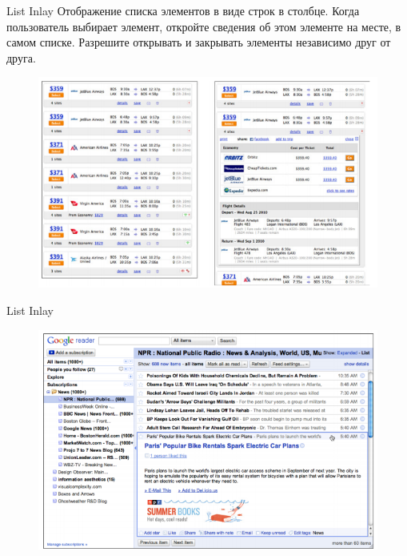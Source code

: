 \documentclass{beamer}
\begin{document}
\begin{frame}[t]{List Inlay}
	Отображение списка элементов в виде строк в столбце. Когда пользователь выбирает элемент, откройте сведения об этом элементе на месте, в самом списке. Разрешите открывать и закрывать элементы независимо друг от друга.
	\begin{figure}[h]
		\centering
		\includegraphics[scale=0.5]{images/lec07-pic52.png}
	\end{figure}
\end{frame}	

\begin{frame}[t]{List Inlay}	
	\begin{figure}[h]
		\centering
		\includegraphics[scale=0.6]{images/lec07-pic53.png}
	\end{figure}
\end{frame}	
\end{document}
